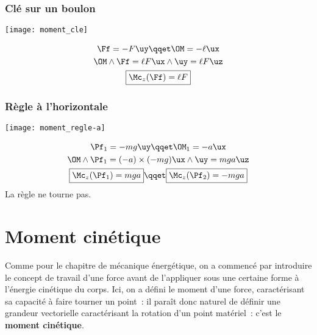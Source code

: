 \documentclass[../../main/main.tex]{subfiles}
\begin{document}
\subsubsection{Clé sur un boulon}
\begin{minipage}[c]{0.25\linewidth}
	\begin{center}
		\texttt{[image: moment\_cle]}
	\end{center}
\end{minipage}
\hfill
\begin{minipage}{0.70\linewidth}
	\begin{gather*}
		\Ff = -F\uy
		\qqet
		\OM = -\ell\ux
		\\
		\OM\wedge\Ff = \ell F\ux\wedge\uy = \ell F \uz
		\\
		\boxed{\Mc_z(\Ff) = \ell F}
	\end{gather*}
\end{minipage}

\subsubsection{Règle à l'horizontale}
\begin{minipage}[c]{0.25\linewidth}
	\begin{center}
		\texttt{[image: moment\_regle-a]}
	\end{center}
\end{minipage}
\hfill
\begin{minipage}{0.65\linewidth}
	\begin{gather*}
		\Pf_1 = -mg\uy
		\qqet
		\OM_1 = -a\ux
		\\
		\OM\wedge\Pf_1 = (-a)\times(-mg)\ux\wedge\uy = mga\uz
		\\
		\boxed{\Mc_z(\Pf_1) = mga}
		\qqet
		\boxed{\Mc_z(\Pf_2) = -mga}
	\end{gather*}
	\centering La règle ne tourne pas.
\end{minipage}

\section{Moment cinétique}
Comme pour le chapitre de mécanique énergétique, on a commencé par introduire le
concept de travail d'une force avant de l'appliquer sous une certaine forme à
l'énergie cinétique du corps. Ici, on a défini le moment d'une force,
caractérisant sa capacité à faire tourner un point~: il paraît donc naturel de
définir une grandeur vectorielle caractérisant la rotation d'un point matériel~:
c'est le \textbf{moment cinétique}.
\end{document}
